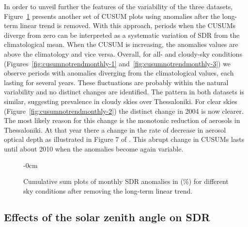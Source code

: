 \documentclass[applsci,article,submit,moreauthors,pdftex]{Definitions/mdpi}
\begin{document}
In order to unveil further the features of the variability of the three
datasets, Figure~\ref{fig:cusumnotrendmonthly} presents another set of
CUSUM plots using anomalies after the long-term linear trend is removed.
With this approach, periods when the CUSUMs diverge from zero can be
interpreted as a systematic variation of SDR from the climatological
mean. When the CUSUM is increasing, the anomalies values are above the
climatology and vice versa. Overall, for all- and cloudy-sky conditions
(Figures~\ref{fig:cusumnotrendmonthly-1}
and~\ref{fig:cusumnotrendmonthly-3}) we observe periods with anomalies
diverging from the climatological values, each lasting for several
years. These fluctuations are probably within the natural variability
and no distinct changes are identified. The pattern in both datasets is
similar, suggesting prevalence in cloudy skies over Thessaloniki. For
clear skies (Figure~\ref{fig:cusumnotrendmonthly-2}) the distinct change
in 2004 is now clearer. The most likely reason for this change is the
monotonic reduction of aerosols in Thessaloniki. At that year there a
change in the rate of decrease in aerosol optical depth as illustrated
in Figure 7 of \citet{Siomos2020}. This abrupt change in CUSUMs lasts
until about 2010 when the anomalies become again variable.

\begin{figure}[h!]
    \begin{adjustwidth}{-\extralength}{0cm}
        {\centering 
            \hfill
            \hfill
        }
        \caption{Cumulative sum plots of monthly SDR anomalies in (\%) for different sky conditions after removing the long-term linear trend.}\label{fig:cusumnotrendmonthly}
\end{adjustwidth}
\end{figure}

\hypertarget{effects-of-the-solar-zenith-angle-on-sdr}{%
\subsection{Effects of the solar zenith angle on
SDR}\label{effects-of-the-solar-zenith-angle-on-sdr}}
\end{document}
